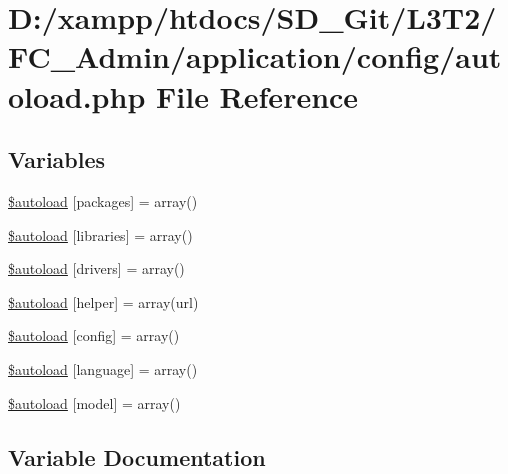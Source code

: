 \hypertarget{autoload_8php}{}\section{D\+:/xampp/htdocs/\+S\+D\+\_\+\+Git/\+L3\+T2/\+F\+C\+\_\+\+Admin/application/config/autoload.php File Reference}
\label{autoload_8php}
\subsection*{Variables}
\begin{DoxyCompactItemize}
\item 
\hyperlink{autoload_8php_ab562c5bbb18f14d6b6b7014d9166625d}{\$autoload} \mbox{[}\textquotesingle{}packages\textquotesingle{}\mbox{]} = array()
\item 
\hyperlink{autoload_8php_ab86d0a1a62e12b528eacaa7100bc4d93}{\$autoload} \mbox{[}\textquotesingle{}libraries\textquotesingle{}\mbox{]} = array()
\item 
\hyperlink{autoload_8php_ab5159fd0a997ccee7145f373cdab896f}{\$autoload} \mbox{[}\textquotesingle{}drivers\textquotesingle{}\mbox{]} = array()
\item 
\hyperlink{autoload_8php_aa98014ce8ad854ad9500e65ff159272d}{\$autoload} \mbox{[}\textquotesingle{}helper\textquotesingle{}\mbox{]} = array(\textquotesingle{}url\textquotesingle{})
\item 
\hyperlink{autoload_8php_ac051887e192979c0320e05821bad8f33}{\$autoload} \mbox{[}\textquotesingle{}config\textquotesingle{}\mbox{]} = array()
\item 
\hyperlink{autoload_8php_addfee4f4b38a8235172cb173995a9c0b}{\$autoload} \mbox{[}\textquotesingle{}language\textquotesingle{}\mbox{]} = array()
\item 
\hyperlink{autoload_8php_a942b884082b1defda7fb10ee71bba324}{\$autoload} \mbox{[}\textquotesingle{}model\textquotesingle{}\mbox{]} = array()
\end{DoxyCompactItemize}


\subsection{Variable Documentation}
\hypertarget{autoload_8php_ab562c5bbb18f14d6b6b7014d9166625d}{}
